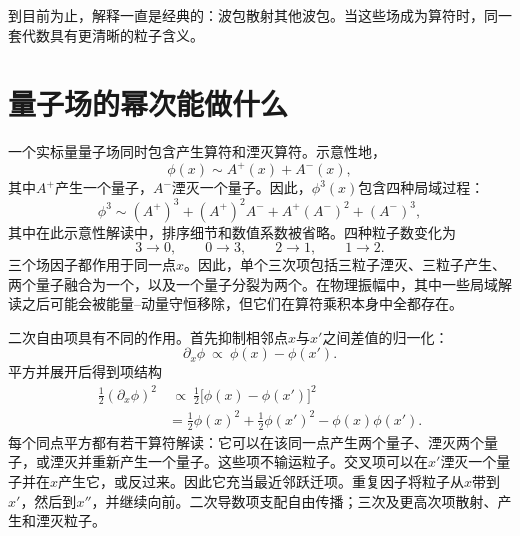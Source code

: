 到目前为止，解释一直是经典的：波包散射其他波包。当这些场成为算符时，同一套代数具有更清晰的粒子含义。

\section{量子场的幂次能做什么}

一个实标量量子场同时包含产生算符和湮灭算符。示意性地，
\begin{equation}
\phi(x)\sim A^+(x)+A^-(x),
\end{equation}
其中\(A^+\)产生一个量子，\(A^-\)湮灭一个量子。因此，\(\phi^3(x)\)包含四种局域过程：
\begin{equation}
\phi^3
\sim
(A^+)^3+(A^+)^2A^-+A^+(A^-)^2+(A^-)^3,
\end{equation}
其中在此示意性解读中，排序细节和数值系数被省略。四种粒子数变化为
\begin{equation}
3\longrightarrow0,
\qquad
0\longrightarrow3,
\qquad
2\longrightarrow1,
\qquad
1\longrightarrow2.
\end{equation}
三个场因子都作用于同一点\(x\)。因此，单个三次项包括三粒子湮灭、三粒子产生、两个量子融合为一个，以及一个量子分裂为两个。在物理振幅中，其中一些局域解读之后可能会被能量--动量守恒移除，但它们在算符乘积本身中全都存在。

二次自由项具有不同的作用。首先抑制相邻点\(x\)与\(x'\)之间差值的归一化：
\begin{equation}
\partial_x\phi
\ \propto\
\phi(x)-\phi(x').
\end{equation}
平方并展开后得到项结构
\begin{align}
\frac12(\partial_x\phi)^2
&\ \propto\
\frac12\bigl[\phi(x)-\phi(x')\bigr]^2
\\
&=
\frac12\phi(x)^2
+\frac12\phi(x')^2
-\phi(x)\phi(x').
\end{align}
每个同点平方都有若干算符解读：它可以在该同一点产生两个量子、湮灭两个量子，或湮灭并重新产生一个量子。这些项不输运粒子。交叉项可以在\(x'\)湮灭一个量子并在\(x\)产生它，或反过来。因此它充当最近邻跃迁项。重复因子将粒子从\(x\)带到\(x'\)，然后到\(x''\)，并继续向前。二次导数项支配自由传播；三次及更高次项散射、产生和湮灭粒子。

\begin{classroomqa}
\end{classroomqa}

